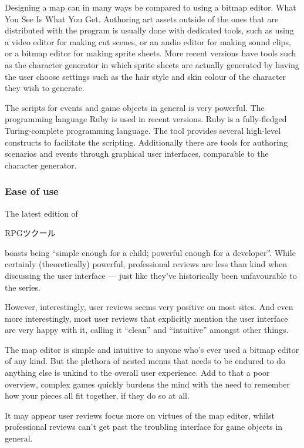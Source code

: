 Designing a map can in many ways be compared to using a bitmap editor. What 
You See Is What You Get. Authoring art assets outside of the ones that are 
distributed with the program is usually done with dedicated tools, such as 
using a video editor for making cut scenes, or an audio editor for making 
sound clips, or a bitmap editor for making sprite sheets. More recent versions 
have tools such as the character generator in which sprite sheets are actually 
generated by having the user choose settings such as the hair style and skin 
colour of the character they wish to generate.

The scripts for events and game objects in general is very powerful. The 
programming language Ruby is used in recent versions. Ruby is a fully-fledged 
Turing-complete programming language. The tool provides several high-level 
constructs to facilitate the scripting. Additionally there are tools for 
authoring scenarios and events through graphical user interfaces, comparable 
to the character generator.

\subsubsection{Ease of use}

The latest edition of \begin{CJK}{UTF8}{min}RPGツクール\end{CJK} boasts being 
``simple enough for a child; powerful enough for a 
developer''\cite{rpgmakervxace}. While certainly (theoretically) powerful, 
professional reviews are less than kind when discussing the user 
interface\cite{johnrpg} --- just like they've historically been unfavourable 
to the series\cite{gamespotrpg}.

However, interestingly, user reviews seems very positive on most 
sites\cite{metacriticrpg, amazonrpg, steamrpg}. And even more interestingly, 
most user reviews that explicitly mention the user interface are very happy 
with it, calling it ``clean'' and ``intuitive'' amongst other things.

The map editor is simple and intuitive to anyone who's ever used a bitmap 
editor of any kind. But the plethora of nested menus that needs to be endured 
to do anything else is unkind to the overall user experience. Add to that a 
poor overview, complex games quickly burdens the mind with the need to 
remember how your pieces all fit together, if they do so at all.

It may appear user reviews focus more on virtues of the map editor, whilst 
professional reviews can't get past the troubling interface for game objects 
in general.

